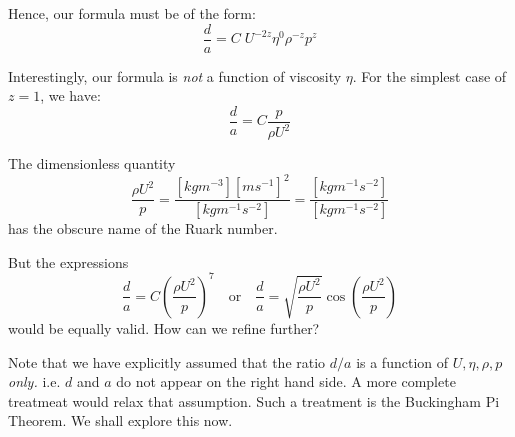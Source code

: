\documentclass[12pt, a4paper, twoside, openright]{book}
\begin{document}

Hence, our formula must be of the form:
\begin{equation}
\frac{d}{a} = C \; U^{-2z} \eta^{0} \rho^{-z} p^{z}
\end{equation}

Interestingly, our formula is \emph{not} a function of viscosity $\eta$.
For the simplest case of $z=1$, we have:
\begin{equation}
\frac{d}{a} = C \frac{p}{\rho U^2}
\end{equation}

The dimensionless quantity
\begin{equation}
 \frac{\rho U^2}{p} = \frac{[kg m^{-3}] [m s^{-1}]^2}{[kg m^{-1} s^{-2}]} = \frac{[kg m^{-1} s^{-2}]}{[kg m^{-1} s^{-2}]} 
\end{equation}
has the obscure name of the Ruark number.

\vspace*{1em}
But the expressions
\begin{equation}
\frac{d}{a} = C \left( \frac{\rho U^2}{p} \right)^7
\quad \text{or} \quad
\frac{d}{a} = \sqrt{ \frac{\rho U^2}{p} } \cos \left( \frac{\rho U^2}{p} \right)
\end{equation}
would be equally valid.  How can we refine further?

\vspace{1em}
Note that we have explicitly assumed that the ratio $d/a$ is a function of $U, \eta, \rho, p$ \emph{only.} i.e. $d$ and $a$ do not appear on the right hand side. A more complete treatmeat would relax that assumption.  Such a treatment is the Buckingham Pi Theorem.  We shall explore this now.
\end{document}
